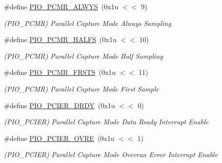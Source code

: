 \begin{DoxyCompactItemize}
\mbox{\label{group__SAMV71__PIO_ga0c7ad88977b270dfdc19ee2a8b3fc444}} 
\#define \mbox{\hyperlink{group__SAMV71__PIO_ga0c7ad88977b270dfdc19ee2a8b3fc444}{P\+I\+O\+\_\+\+P\+C\+M\+R\+\_\+\+A\+L\+W\+YS}}~(0x1u $<$$<$ 9)
\begin{DoxyCompactList}\small\item\em (P\+I\+O\+\_\+\+P\+C\+MR) Parallel Capture Mode Always Sampling \end{DoxyCompactList}\item 
\mbox{\label{group__SAMV71__PIO_ga097749691c0da7ad071b05984ae0a5ca}} 
\#define \mbox{\hyperlink{group__SAMV71__PIO_ga097749691c0da7ad071b05984ae0a5ca}{P\+I\+O\+\_\+\+P\+C\+M\+R\+\_\+\+H\+A\+L\+FS}}~(0x1u $<$$<$ 10)
\begin{DoxyCompactList}\small\item\em (P\+I\+O\+\_\+\+P\+C\+MR) Parallel Capture Mode Half Sampling \end{DoxyCompactList}\item 
\mbox{\label{group__SAMV71__PIO_ga20c4b97bfe78c813ebc4bd0f511930ef}} 
\#define \mbox{\hyperlink{group__SAMV71__PIO_ga20c4b97bfe78c813ebc4bd0f511930ef}{P\+I\+O\+\_\+\+P\+C\+M\+R\+\_\+\+F\+R\+S\+TS}}~(0x1u $<$$<$ 11)
\begin{DoxyCompactList}\small\item\em (P\+I\+O\+\_\+\+P\+C\+MR) Parallel Capture Mode First Sample \end{DoxyCompactList}\item 
\mbox{\label{group__SAMV71__PIO_gafbbd2a25573010d1aab2945e8c28c7e2}} 
\#define \mbox{\hyperlink{group__SAMV71__PIO_gafbbd2a25573010d1aab2945e8c28c7e2}{P\+I\+O\+\_\+\+P\+C\+I\+E\+R\+\_\+\+D\+R\+DY}}~(0x1u $<$$<$ 0)
\begin{DoxyCompactList}\small\item\em (P\+I\+O\+\_\+\+P\+C\+I\+ER) Parallel Capture Mode Data Ready Interrupt Enable \end{DoxyCompactList}\item 
\mbox{\label{group__SAMV71__PIO_ga88dbc7c44b5f60a8e4e29d073e6387b3}} 
\#define \mbox{\hyperlink{group__SAMV71__PIO_ga88dbc7c44b5f60a8e4e29d073e6387b3}{P\+I\+O\+\_\+\+P\+C\+I\+E\+R\+\_\+\+O\+V\+RE}}~(0x1u $<$$<$ 1)
\begin{DoxyCompactList}\small\item\em (P\+I\+O\+\_\+\+P\+C\+I\+ER) Parallel Capture Mode Overrun Error Interrupt Enable \end{DoxyCompactList}\item 
$$
\end{DoxyCompactItemize}
